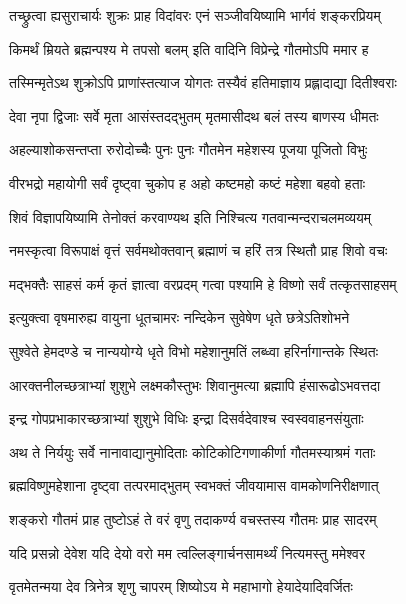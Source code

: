 \twolineshloka
{तच्छ्रुत्वा ह्यसुराचार्यः शुक्रः प्राह विदांवरः}
{एनं सञ्जीवयिष्यामि भार्गवं शङ्करप्रियम्}%

\twolineshloka
{किमर्थं म्रियते ब्रह्मन्पश्य मे तपसो बलम्}
{इति वादिनि विप्रेन्द्रे गौतमोऽपि ममार ह}%

\twolineshloka
{तस्मिन्मृतेऽथ शुक्रोऽपि प्राणांस्तत्याज योगतः}
{तस्यैवं हतिमाज्ञाय प्रह्लादाद्या दितीश्वराः}%

\twolineshloka
{देवा नृपा द्विजाः सर्वे मृता आसंस्तदद्भुतम्}
{मृतमासीदथ बलं तस्य बाणस्य धीमतः}%

\twolineshloka
{अहल्याशोकसन्तप्ता रुरोदोच्चैः पुनः पुनः}
{गौतमेन महेशस्य पूजया पूजितो विभुः}%

\twolineshloka
{वीरभद्रो महायोगी सर्वं दृष्ट्वा चुकोप ह}
{अहो कष्टमहो कष्टं महेशा बहवो हताः}%

\twolineshloka
{शिवं विज्ञापयिष्यामि तेनोक्तं करवाण्यथ}
{इति निश्चित्य गतवान्मन्दराचलमव्ययम्}%

\twolineshloka
{नमस्कृत्वा विरूपाक्षं वृत्तं सर्वमथोक्तवान्}
{ब्रह्माणं च हरिं तत्र स्थितौ प्राह शिवो वचः}%

\twolineshloka
{मद्भक्तैः साहसं कर्म कृतं ज्ञात्वा वरप्रदम्}
{गत्वा पश्यामि हे विष्णो सर्वं तत्कृतसाहसम्}%

\twolineshloka
{इत्युक्त्वा वृषमारुह्य वायुना धूतचामरः}
{नन्दिकेन सुवेषेण धृते छत्रेऽतिशोभने}%

\twolineshloka
{सुश्वेते हेमदण्डे च नान्ययोग्ये धृते विभो}
{महेशानुमतिं लब्ध्वा हरिर्नागान्तके स्थितः}%

\twolineshloka
{आरक्तनीलच्छत्राभ्यां शुशुभे लक्ष्मकौस्तुभः}
{शिवानुमत्या ब्रह्मापि हंसारूढोऽभवत्तदा}%

\twolineshloka
{इन्द्र गोपप्रभाकारच्छत्राभ्यां शुशुभे विधिः}
{इन्द्रा दिसर्वदेवाश्च स्वस्ववाहनसंयुताः}%

\twolineshloka
{अथ ते निर्ययुः सर्वे नानावाद्यानुमोदिताः}
{कोटिकोटिगणाकीर्णा गौतमस्याश्रमं गताः}%

\twolineshloka
{ब्रह्मविष्णुमहेशाना दृष्ट्वा तत्परमाद्भुतम्}
{स्वभक्तं जीवयामास वामकोणनिरीक्षणात्}%

\twolineshloka
{शङ्करो गौतमं प्राह तुष्टोऽहं ते वरं वृणु}
{तदाकर्ण्य वचस्तस्य गौतमः प्राह सादरम्}%

\twolineshloka
{यदि प्रसन्नो देवेश यदि देयो वरो मम}
{त्वल्लिङ्गार्चनसामर्थ्यं नित्यमस्तु ममेश्वर}%

\twolineshloka
{वृतमेतन्मया देव त्रिनेत्र शृणु चापरम्}
{शिष्योऽय मे महाभागो हेयादेयादिवर्जितः}%

